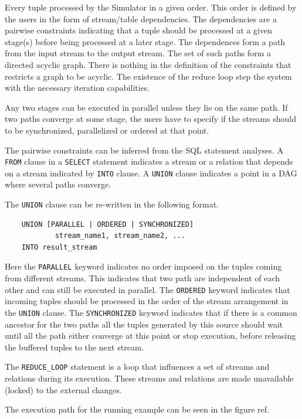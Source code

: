 \documentclass{article}
\begin{document}
Every tuple processed by the Simulator in a given order. This order is defined by the users in the form of stream/table dependencies. The dependencies are a pairwise constraints indicating that a tuple should be processed at a given stage(s) before being processed at a later stage. The dependences form a path from the input stream to the output stream. The set of such paths form a directed acyclic graph. There is nothing in the definition of the constraints that restricts a graph to be acyclic. The existence of the reduce loop step the system with the necessary iteration capabilities. 

Any two stages can be executed in parallel unless they lie on the same path. If two paths converge at some stage, the users have to specify if the streams should to be synchronized, parallelized or ordered at that point.

The pairwise constraints can be inferred from the SQL statement analyses. A {\tt FROM} clause in a {\tt SELECT} statement indicates a stream or a relation that depends on a stream indicated by {\tt INTO} clause. A {\tt UNION} clause indicates a point in a DAG where several paths converge.

The {\tt UNION} clause can be re-written in the following format.

\begin{verbatim}
    UNION [PARALLEL | ORDERED | SYNCHRONIZED]
            stream_name1, stream_name2, ...
    INTO result_stream
\end{verbatim}   

\noindent Here the {\tt PARALLEL} keyword indicates no order imposed on the tuples coming from different streams. This indicates that two path are independent of each other and can still be executed in parallel. The {\tt ORDERED} keyword indicates that incoming tuples should be processed in the order of the stream arrangement in the {\tt UNION} clause. The {\tt SYNCHRONIZED} keyword indicates that if there is a common ancestor for the two paths all the tuples generated by this source should wait until all the path either converge at this point or stop execution, before releasing the buffered tuples to the next stream. 

The {\tt REDUCE\_LOOP} statement is a loop that influences a set of streams and relations during its execution. These streams and relations are made unavailable (locked) to the external changes. 

The execution path for the running example can be seen in the figure ref. 
\end{document}
